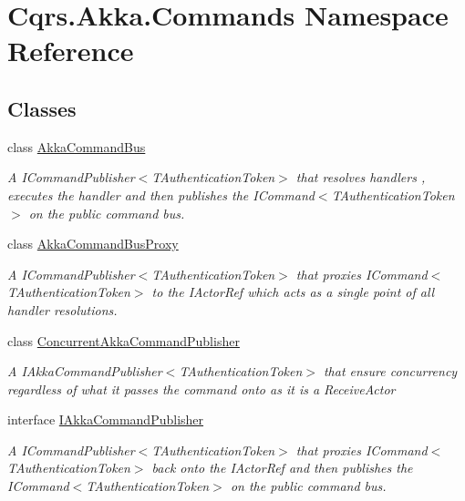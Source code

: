 \hypertarget{namespaceCqrs_1_1Akka_1_1Commands}{}\section{Cqrs.\+Akka.\+Commands Namespace Reference}
\label{namespaceCqrs_1_1Akka_1_1Commands}
\subsection*{Classes}
\begin{DoxyCompactItemize}
\item 
class \hyperlink{classCqrs_1_1Akka_1_1Commands_1_1AkkaCommandBus}{Akka\+Command\+Bus}
\begin{DoxyCompactList}\small\item\em A I\+Command\+Publisher$<$\+T\+Authentication\+Token$>$ that resolves handlers , executes the handler and then publishes the I\+Command$<$\+T\+Authentication\+Token$>$ on the public command bus. \end{DoxyCompactList}\item 
class \hyperlink{classCqrs_1_1Akka_1_1Commands_1_1AkkaCommandBusProxy}{Akka\+Command\+Bus\+Proxy}
\begin{DoxyCompactList}\small\item\em A I\+Command\+Publisher$<$\+T\+Authentication\+Token$>$ that proxies I\+Command$<$\+T\+Authentication\+Token$>$ to the I\+Actor\+Ref which acts as a single point of all handler resolutions. \end{DoxyCompactList}\item 
class \hyperlink{classCqrs_1_1Akka_1_1Commands_1_1ConcurrentAkkaCommandPublisher}{Concurrent\+Akka\+Command\+Publisher}
\begin{DoxyCompactList}\small\item\em A I\+Akka\+Command\+Publisher$<$\+T\+Authentication\+Token$>$ that ensure concurrency regardless of what it passes the command onto as it is a Receive\+Actor \end{DoxyCompactList}\item 
interface \hyperlink{interfaceCqrs_1_1Akka_1_1Commands_1_1IAkkaCommandPublisher}{I\+Akka\+Command\+Publisher}
\begin{DoxyCompactList}\small\item\em A I\+Command\+Publisher$<$\+T\+Authentication\+Token$>$ that proxies I\+Command$<$\+T\+Authentication\+Token$>$ back onto the I\+Actor\+Ref and then publishes the I\+Command$<$\+T\+Authentication\+Token$>$ on the public command bus. \end{DoxyCompactList}\item 

\end{DoxyCompactItemize}
